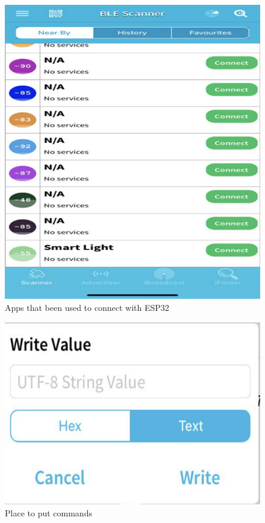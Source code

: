 \begin{figure}[htbp]
\centerline{\includegraphics{image10.png}}
\caption{Apps that been used to connect with ESP32}
\label{fig}
\end{figure}




\begin{figure}[htbp]
\centerline{\includegraphics{image11.png}}
\caption{Place to put commands}
\label{fig}
\end{figure}








